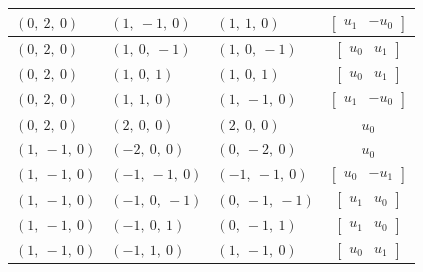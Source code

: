 \documentclass[11pt]{article}
\theoremstyle{definition}
\begin{document}
\begin{longtable}{|l|l|l|c|}
    \hline
    $\left( 0, \  2, \  0\right)$ & $\left( 1, \  -1, \  0\right)$ & $\left( 1, \  1, \  0\right)$ & $\left[\begin{matrix}u_{1} & - u_{0}\end{matrix}\right]$ \\
    \hline
    $\left( 0, \  2, \  0\right)$ & $\left( 1, \  0, \  -1\right)$ & $\left( 1, \  0, \  -1\right)$ & $\left[\begin{matrix}u_{0} & u_{1}\end{matrix}\right]$ \\
    \hline
    $\left( 0, \  2, \  0\right)$ & $\left( 1, \  0, \  1\right)$ & $\left( 1, \  0, \  1\right)$ & $\left[\begin{matrix}u_{0} & u_{1}\end{matrix}\right]$ \\
    \hline
    $\left( 0, \  2, \  0\right)$ & $\left( 1, \  1, \  0\right)$ & $\left( 1, \  -1, \  0\right)$ & $\left[\begin{matrix}u_{1} & - u_{0}\end{matrix}\right]$ \\
    \hline
    $\left( 0, \  2, \  0\right)$ & $\left( 2, \  0, \  0\right)$ & $\left( 2, \  0, \  0\right)$ & $u_{0}$ \\
    \hline
    $\left( 1, \  -1, \  0\right)$ & $\left( -2, \  0, \  0\right)$ & $\left( 0, \  -2, \  0\right)$ & $u_{0}$ \\
    \hline
    $\left( 1, \  -1, \  0\right)$ & $\left( -1, \  -1, \  0\right)$ & $\left( -1, \  -1, \  0\right)$ & $\left[\begin{matrix}u_{0} & - u_{1}\end{matrix}\right]$ \\
    \hline
    $\left( 1, \  -1, \  0\right)$ & $\left( -1, \  0, \  -1\right)$ & $\left( 0, \  -1, \  -1\right)$ & $\left[\begin{matrix}u_{1} & u_{0}\end{matrix}\right]$ \\
    \hline
    $\left( 1, \  -1, \  0\right)$ & $\left( -1, \  0, \  1\right)$ & $\left( 0, \  -1, \  1\right)$ & $\left[\begin{matrix}u_{1} & u_{0}\end{matrix}\right]$ \\
    \hline
    $\left( 1, \  -1, \  0\right)$ & $\left( -1, \  1, \  0\right)$ & $\left( 1, \  -1, \  0\right)$ & $\left[\begin{matrix}u_{0} & u_{1}\end{matrix}\right]$ \\

\end{longtable}
\end{document}
